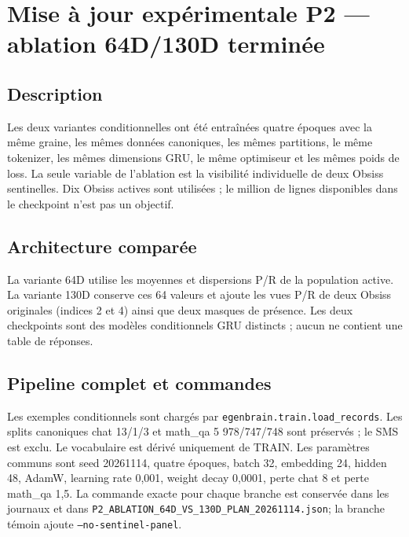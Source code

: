 \documentclass[11pt,a4paper]{report}
\begin{document}
\chapter{Mise à jour expérimentale P2 — ablation 64D/130D terminée}
\label{chap:p2-ablation-results}
\section{Description}
Les deux variantes conditionnelles ont été entraînées quatre époques avec la même graine, les mêmes données canoniques, les mêmes partitions, le même tokenizer, les mêmes dimensions GRU, le même optimiseur et les mêmes poids de loss. La seule variable de l'ablation est la visibilité individuelle de deux Obsiss sentinelles. Dix Obsiss actives sont utilisées ; le million de lignes disponibles dans le checkpoint n'est pas un objectif.
\section{Architecture comparée}
La variante 64D utilise les moyennes et dispersions P/R de la population active. La variante 130D conserve ces 64 valeurs et ajoute les vues P/R de deux Obsiss originales (indices 2 et 4) ainsi que deux masques de présence. Les deux checkpoints sont des modèles conditionnels GRU distincts ; aucun ne contient une table de réponses.
\section{Pipeline complet et commandes}
Les exemples conditionnels sont chargés par \texttt{egenbrain.train.load\_records}. Les splits canoniques chat 13/1/3 et math\_qa 5 978/747/748 sont préservés ; le SMS est exclu. Le vocabulaire est dérivé uniquement de TRAIN. Les paramètres communs sont seed 20261114, quatre époques, batch 32, embedding 24, hidden 48, AdamW, learning rate 0,001, weight decay 0,0001, perte chat 8 et perte math\_qa 1,5. La commande exacte pour chaque branche est conservée dans les journaux et dans \texttt{P2\_ABLATION\_64D\_VS\_130D\_PLAN\_20261114.json}; la branche témoin ajoute \texttt{--no-sentinel-panel}.
\end{document}
